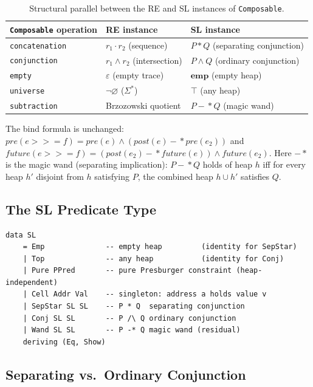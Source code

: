 \documentclass[acmsmall,screen]{acmart}
\newcommand{\sep}{*}
\newcommand{\wand}{-\!\!*}
\newcommand{\pre}{\mathit{pre}}
\newcommand{\post}{\mathit{post}}
\newcommand{\fut}{\mathit{future}}
\newcommand{\univ}{\neg\varnothing}
\begin{document}
\begin{table}[h]
\caption{Structural parallel between the RE and SL instances of
         \lstinline{Composable}.}
\label{tab:sl-re-parallel}
\begin{tabular}{lll}
\toprule
\lstinline{Composable} operation & RE instance & SL instance \\
\midrule
\lstinline{concatenation} & $r_1 \cdot r_2$ (sequence) & $P \sep Q$ (separating conjunction) \\
\lstinline{conjunction}   & $r_1 \wedge r_2$ (intersection) & $P \wedge Q$ (ordinary conjunction) \\
\lstinline{empty}         & $\varepsilon$ (empty trace) & $\mathbf{emp}$ (empty heap) \\
\lstinline{universe}      & $\univ$ ($\Sigma^*$) & $\top$ (any heap) \\
\lstinline{subtraction}   & Brzozowski quotient & $P \wand Q$ (magic wand) \\
\bottomrule
\end{tabular}
\end{table}

\noindent
The bind formula is unchanged:
$\pre(e \mathbin{>\!\!>\!\!=} f) = \pre(e) \wedge (\post(e) \wand \pre(e_2))$
and
$\fut(e \mathbin{>\!\!>\!\!=} f) = (\post(e_2) \wand \fut(e)) \wedge \fut(e_2)$.
Here $\wand$ is the magic wand (separating implication):
$P \wand Q$ holds of heap $h$ iff for every heap $h'$ disjoint from $h$
satisfying $P$, the combined heap $h \cup h'$ satisfies $Q$.

\subsection{The SL Predicate Type}

\begin{lstlisting}
data SL
    = Emp              -- empty heap         (identity for SepStar)
    | Top              -- any heap           (identity for Conj)
    | Pure PPred       -- pure Presburger constraint (heap-independent)
    | Cell Addr Val    -- singleton: address a holds value v
    | SepStar SL SL    -- P * Q  separating conjunction
    | Conj SL SL       -- P /\ Q ordinary conjunction
    | Wand SL SL       -- P -* Q magic wand (residual)
    deriving (Eq, Show)
\end{lstlisting}

\subsection{Separating vs.\ Ordinary Conjunction}
\end{document}
